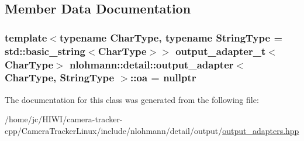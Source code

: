 \subsection{Member Data Documentation}
\subsubsection[{\texorpdfstring{oa}{oa}}]{\setlength{\rightskip}{0pt plus 5cm}template$<$typename Char\+Type, typename String\+Type = std\+::basic\+\_\+string$<$\+Char\+Type$>$$>$ {\bf output\+\_\+adapter\+\_\+t}$<$Char\+Type$>$ {\bf nlohmann\+::detail\+::output\+\_\+adapter}$<$ Char\+Type, String\+Type $>$\+::oa = nullptr\hspace{0.3cm}{\ttfamily [private]}}\hypertarget{classnlohmann_1_1detail_1_1output__adapter_a323c18d74d6680faafec6dc3ace825e2}{}\label{classnlohmann_1_1detail_1_1output__adapter_a323c18d74d6680faafec6dc3ace825e2}


The documentation for this class was generated from the following file\+:\begin{DoxyCompactItemize}
\item 
/home/jc/\+H\+I\+W\+I/camera-\/tracker-\/cpp/\+Camera\+Tracker\+Linux/include/nlohmann/detail/output/\hyperlink{output__adapters_8hpp}{output\+\_\+adapters.\+hpp}\end{DoxyCompactItemize}
